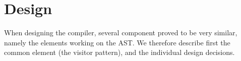 \section{Design}
\label{sec:design}

When designing the \lang{} compiler, several component proved to be very similar, namely the elements working on the AST. We therefore describe first the common element (the visitor pattern), and the individual design decisions.



\newpage




